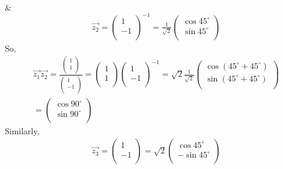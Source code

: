 \documentclass[journal,12pt,twocolumn]{IEEEtran}
\begin{document}
$\&$
\begin{align}
\vec{z_2} = \begin{pmatrix}
      1 \\ 
      -1 \\
      \end{pmatrix}^{-1} = \frac{1}{\sqrt{2}}\begin{pmatrix}
      \cos45^{\circ} \\ 
      \sin45^{\circ} \\
      \end{pmatrix}
\end{align}
So, \\
\begin{equation}
\begin{aligned}
\vec{z_1} \vec{z_2} = \frac{\begin{pmatrix}
      1 \\ 
      1 \\
      \end{pmatrix}}{\begin{pmatrix}
      1 \\ 
      -1 \\
      \end{pmatrix}}=\begin{pmatrix}
      1 \\ 
      1 \\
      \end{pmatrix} \begin{pmatrix}
      1 \\ 
      -1 \\
      \end{pmatrix}^{-1} = \sqrt{2}\frac{1}{\sqrt{2}}\begin{pmatrix}
      \cos(45^{\circ}+45^{\circ})\\ 
      \sin(45^{\circ}+45^{\circ})\\
      \end{pmatrix}\\
      =\begin{pmatrix}
      \cos90^{\circ} \\ 
      \sin90^{\circ} \\
      \end{pmatrix}
\end{aligned}
\end{equation}
Similarly,\\
\begin{align}
\vec{z_3} = \begin{pmatrix}
      1 \\ 
      -1 \\
      \end{pmatrix} = \sqrt{2}\begin{pmatrix}
      \cos45^{\circ} \\ 
      -\sin45^{\circ} \\
      \end{pmatrix}
\end{align}
\end{document}
